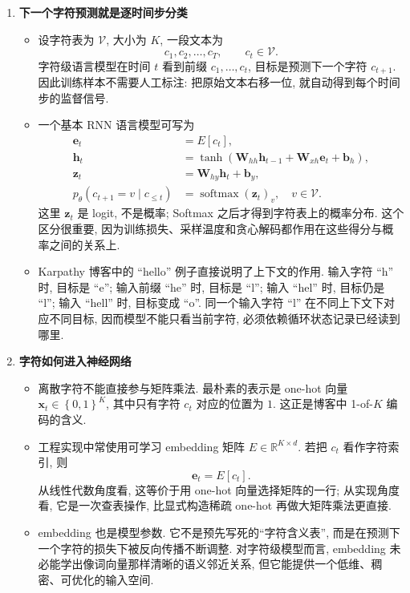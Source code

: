 \documentclass{../nndlcourse}
\begin{document}
\begin{enumerate}
\item \textbf{下一个字符预测就是逐时间步分类}
  \begin{itemize}
    \item 设字符表为 $\mathcal{V}$, 大小为 $K$, 一段文本为
    \begin{equation*}
      c_1,c_2,\ldots,c_T, \qquad c_t \in \mathcal{V}.
    \end{equation*}
    字符级语言模型在时间 $t$ 看到前缀 $c_1,\ldots,c_t$, 目标是预测下一个字符 $c_{t+1}$. 因此训练样本不需要人工标注: 把原始文本右移一位, 就自动得到每个时间步的监督信号.
    \item 一个基本 RNN 语言模型可写为
    \begin{align*}
      \boldsymbol{e}_t &= E[c_t], \\
      \boldsymbol{h}_t &= \tanh\left(\boldsymbol{W}_{hh}\boldsymbol{h}_{t-1}
        + \boldsymbol{W}_{xh}\boldsymbol{e}_t + \boldsymbol{b}_h\right), \\
      \boldsymbol{z}_t &= \boldsymbol{W}_{hy}\boldsymbol{h}_t + \boldsymbol{b}_y, \\
      p_\theta(c_{t+1}=v \mid c_{\le t}) &= {\operatorname{softmax}(\boldsymbol{z}_t)}_v,
      \quad v\in\mathcal{V}.
    \end{align*}
    这里 $\boldsymbol{z}_t$ 是 logit, 不是概率; Softmax 之后才得到字符表上的概率分布. 这个区分很重要, 因为训练损失、采样温度和贪心解码都作用在这些得分与概率之间的关系上.
    \item Karpathy 博客中的 ``hello'' 例子直接说明了上下文的作用. 输入字符 ``h'' 时, 目标是 ``e''; 输入前缀 ``he'' 时, 目标是 ``l''; 输入 ``hel'' 时, 目标仍是 ``l''; 输入 ``hell'' 时, 目标变成 ``o''. 同一个输入字符 ``l'' 在不同上下文下对应不同目标, 因而模型不能只看当前字符, 必须依赖循环状态记录已经读到哪里.
  \end{itemize}

\item \textbf{字符如何进入神经网络}
  \begin{itemize}
    \item 离散字符不能直接参与矩阵乘法. 最朴素的表示是 one-hot 向量 $\boldsymbol{x}_t\in{\left\{0,1\right\}}^{K}$, 其中只有字符 $c_t$ 对应的位置为 $1$. 这正是博客中 1-of-$K$ 编码的含义.
    \item 工程实现中常使用可学习 embedding 矩阵 $E\in\mathbb{R}^{K\times d}$. 若把 $c_t$ 看作字符索引, 则
    \begin{equation*}
      \boldsymbol{e}_t = E[c_t].
    \end{equation*}
    从线性代数角度看, 这等价于用 one-hot 向量选择矩阵的一行; 从实现角度看, 它是一次查表操作, 比显式构造稀疏 one-hot 再做大矩阵乘法更直接.
    \item embedding 也是模型参数. 它不是预先写死的“字符含义表”, 而是在预测下一个字符的损失下被反向传播不断调整. 对字符级模型而言, embedding 未必能学出像词向量那样清晰的语义邻近关系, 但它能提供一个低维、稠密、可优化的输入空间.
  \end{itemize}


\end{enumerate}
\end{document}
